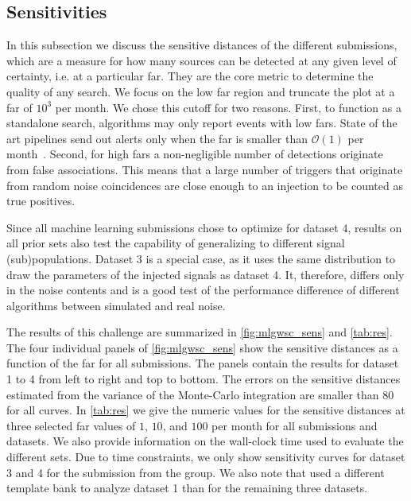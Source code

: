 \subsection{Sensitivities}
In this subsection we discuss the sensitive distances of the different submissions, which are a measure for how many sources can be detected at any given level of certainty, i.e. at a particular \acrshort{far}. They are the core metric to determine the quality of any search. We focus on the low \acrshort{far} region and truncate the plot at a \acrshort{far} of $10^3$ per month. We chose this cutoff for two reasons. First, to function as a standalone search, algorithms may only report events with low \acrshort{far}s. State of the art pipelines send out alerts only when the \acrshort{far} is smaller than $\mathcal{O}\left(1\right)$ per month~\cite{Nitz:2018rgo}. Second, for high \acrshort{far}s a non-negligible number of detections originate from false associations. This means that a large number of triggers that originate from random noise coincidences are close enough to an injection to be counted as true positives.

Since all machine learning submissions chose to optimize for dataset 4, results on all prior sets also test the capability of generalizing to different signal (sub)populations. Dataset 3 is a special case, as it uses the same distribution to draw the parameters of the injected signals as dataset 4. It, therefore, differs only in the noise contents and is a good test of the performance difference of different algorithms between simulated and real noise.

The results of this challenge are summarized in \autoref{fig:mlgwsc_sens} and \autoref{tab:res}. The four individual panels of \autoref{fig:mlgwsc_sens} show the sensitive distances as a function of the \acrshort{far} for all submissions. The panels contain the results for dataset 1 to 4 from left to right and top to bottom. The errors on the sensitive distances estimated from the variance of the Monte-Carlo integration are smaller than \SI{80}{\mega\parsec} for all curves. In \autoref{tab:res} we give the numeric values for the sensitive distances at three selected \acrshort{far} values of $1$, $10$, and $100$ per month for all submissions and datasets. We also provide information on the wall-clock time used to evaluate the different sets. Due to time constraints, we only show sensitivity curves for dataset 3 and 4 for the submission from the \cwb group. We also note that \pycbc used a different template bank to analyze dataset 1 than for the remaining three datasets.

